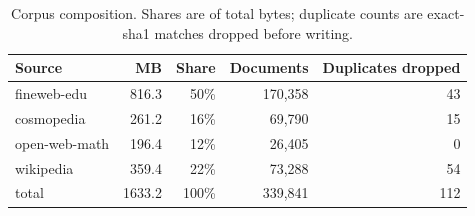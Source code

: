 \begin{table}[htbp]
\centering
\caption{Corpus composition. Shares are of total bytes; duplicate counts are
exact-sha1 matches dropped before writing.}
\label{tab:corpus}
\begin{tabular}{lrrrr}
\toprule
Source & MB & Share & Documents & Duplicates dropped \\
\midrule
fineweb-edu & 816.3 & 50\% & 170{,}358 & 43 \\
cosmopedia & 261.2 & 16\% & 69{,}790 & 15 \\
open-web-math & 196.4 & 12\% & 26{,}405 & 0 \\
wikipedia & 359.4 & 22\% & 73{,}288 & 54 \\
\midrule
total & 1633.2 & 100\% & 339{,}841 & 112 \\
\bottomrule
\end{tabular}
\end{table}
